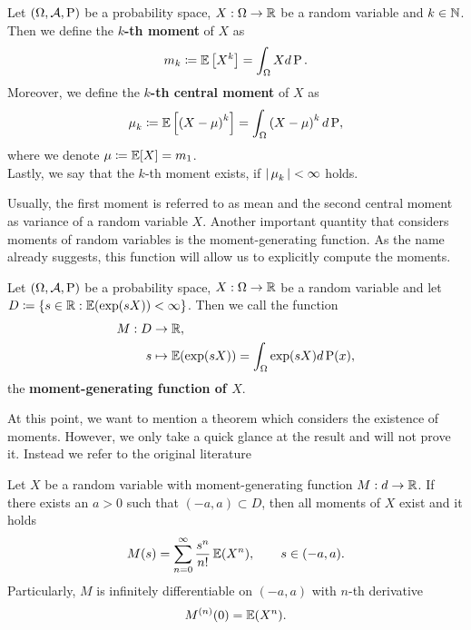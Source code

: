 \begin{definition}\label{def:moment}
Let $(\Omega,\operatorname{\mathcal{A}},\operatorname{\text{P}})$ be a probability space, $X:\Omega \to \operatorname{\mathbb{R}}$ be a random variable and $k\in\operatorname{\mathbb{N}}$. Then we define the \textbf{$k$-th moment} of $X$ as
\begin{align*}
m_k \coloneqq \operatorname{\mathbb{E}} \left[X^k \right] = \int_\Omega Xd\operatorname{\text{P}}.
\end{align*}
Moreover, we define the \textbf{$k$-th central moment} of $X$ as
\begin{align*}
\operatorname{\mu}_k \coloneqq \operatorname{\mathbb{E}} \left[\left(X - \operatorname{\mu} \right)^k \right] = \int_\Omega \left(X - \operatorname{\mu}\right)^k d\operatorname{\text{P}},
\end{align*}
where we denote $\operatorname{\mu}\coloneqq\operatorname{\mathbb{E}}[X] = m_1$.\\
Lastly, we say that the $k$-th moment exists, if $|\operatorname{\mu}_k| < \infty$ holds.
\end{definition}

Usually, the first moment is referred to as mean and the second central moment as variance of a random variable $X$. Another important quantity that considers moments of random variables is the moment-generating function. As the name already suggests, this function will allow us to explicitly compute the moments.

\begin{definition}\label{def:moment_gen}
Let $(\Omega, \operatorname{\mathcal{A}}, \operatorname{\text{P}})$ be a probability space, $X:\Omega\to \operatorname{\mathbb{R}}$ be a random variable and let $D\coloneqq \{ s\in\operatorname{\mathbb{R}}: \operatorname{\mathbb{E}}(\exp(sX))< \infty \}$. Then we call the function
\begin{align*}
M: D &\to \operatorname{\mathbb{R}},\\
s &\mapsto \operatorname{\mathbb{E}}(\exp(sX)) = \int_{\Omega} \exp(sX)d\operatorname{\text{P}}(x),
\end{align*}
the \textbf{moment-generating function of $X$}.
\end{definition}

At this point, we want to mention a theorem which considers the existence of moments. However, we only take a quick glance at the result and will not prove it. Instead we refer to the original literature \cite[Theorem~4.21]{meintrup2006stochastik}
\begin{theorem}
Let $X$ be a random variable with moment-generating function $M:d\to\operatorname{\mathbb{R}}$. If there exists an $a>0$ such that $(-a, a)\subset D$, then all moments of $X$ exist and it holds
\begin{align*}
M(s) = \sum_{n=0}^\infty \frac{s^{n}}{n!} \operatorname{\mathbb{E}}(X^n), \qquad s \in (-a,a).
\end{align*}
Particularly, $M$ is infinitely differentiable on $(-a,a)$ with $n$-th derivative
\begin{align*}
M^{(n)}(0) = \operatorname{\mathbb{E}}(X^n).
\end{align*}
\end{theorem}

